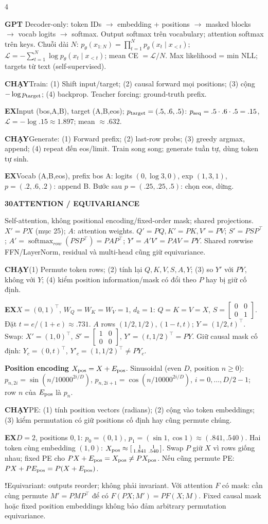 \documentclass[a4paper]{article}
\newcommand{\topic}[2]{\par\addvspace{.8pt}%
  \begingroup\setlength{\fboxsep}{0.5pt}%
  \noindent\colorbox{structure}{\parbox{\dimexpr\linewidth-2\fboxsep\relax}{%
    \color{white}\fontsize{6.5}{7.1}\selectfont\bfseries #1\enspace #2}}%
  \endgroup\par\nobreak\vspace{.3pt}\nobreak}
\newcommand{\run}[1]{\key{CHẠY}#1}
\newcommand{\key}[1]{\par\textcolor{structure}{\textbf{#1}}\enspace}
\newcommand{\note}[4]{\par\begingroup\setlength{\fboxsep}{0.15pt}%
  \noindent\colorbox{#1}{\parbox{\dimexpr\linewidth-2\fboxsep\relax}{%
    \RaggedRight\textcolor{#2}{\textbf{#3}}\enspace #4}}%
  \endgroup\par}
\newcommand{\trap}[1]{\note{warningbg}{warning}{!}{#1}}
\newcommand{\ex}[1]{\note{examplebg}{example}{EX}{#1}}
\begin{document}
\begin{multicols*}{4}
\key{GPT} Decoder-only: token IDs $\to$ embedding + positions $\to$ masked blocks $\to$ vocab logits $\to$ softmax. Output softmax trên vocabulary; attention softmax trên keys.
Chuỗi dài $N$: $p_\theta(x_{1:N})=\prod_{t=1}^N p_\theta(x_t\mid x_{<t})$;
$\mathcal L=-\sum_{t=1}^N\log p_\theta(x_t\mid x_{<t})$; mean CE $=\mathcal L/N$. Max likelihood = min NLL; targets từ text (self-supervised).
\run{Train: (1) Shift input/target; (2) causal forward mọi positions; (3) cộng $-\log p_{\rm target}$; (4) backprop. Teacher forcing: ground-truth prefix.}
\ex{Input (bos,A,B), target (A,B,eos); $p_{\rm target}=(.5,.6,.5)$: $p_{\rm seq}=.5\cdot.6\cdot.5=.15$, $\mathcal L=-\log .15\approx1.897$; mean $\approx.632$.}
\run{Generate: (1) Forward prefix; (2) last-row probs; (3) greedy argmax, append; (4) repeat đến eos/limit. Train song song; generate tuần tự, dùng token tự sinh.}
\ex{Vocab (A,B,eos), prefix bos A: logits $(0,\log3,0)$, exp $(1,3,1)$, $p=(.2,.6,.2)$: append B. Bước sau $p=(.25,.25,.5)$: chọn eos, dừng.}

\topic{30}{ATTENTION / EQUIVARIANCE}
Self-attention, không positional encoding/fixed-order mask; shared projections. $X'=PX$ (mục 25); $A$: attention weights.
$Q'=PQ,K'=PK,V'=PV$;
$S'=PSP^\top$;
$A'=\operatorname{softmax}_{row}(PSP^\top)=PAP^\top$;
$Y'=A'V'=PAV=PY$.
Shared rowwise FFN/LayerNorm, residual và multi-head cũng giữ equivariance.
\run{(1) Permute token rows; (2) tính lại $Q,K,V,S,A,Y$; (3) so $Y'$ với $PY$, không với $Y$; (4) kiểm position information/mask có đổi theo $P$ hay bị giữ cố định.}
\ex{$X=(0,1)^\top$, $W_Q=W_K=W_V=1$, $d_k=1$: $Q=K=V=X$, $S=\left[\begin{smallmatrix}0&0\\0&1\end{smallmatrix}\right]$. Đặt $t=e/(1+e)\approx.731$. $A$ rows $(1/2,1/2),(1-t,t)$; $Y=(1/2,t)^\top$. Swap: $X'=(1,0)^\top$, $S'=\left[\begin{smallmatrix}1&0\\0&0\end{smallmatrix}\right]$, $Y'=(t,1/2)^\top=PY$. Giữ causal mask cố định: $Y_c=(0,t)^\top$, $Y'_c=(1,1/2)^\top\ne PY_c$.}
\key{Position encoding}
$X_{\rm pos}=X+E_{\rm pos}$. Sinusoidal (even $D$, position $n\ge0$):
$p_{n,2i}=\sin(n/10000^{2i/D})$,
$p_{n,2i+1}=\cos(n/10000^{2i/D})$, $i=0,\ldots,D/2-1$; row $n$ của $E_{\rm pos}$ là $p_n$.
\run{PE: (1) tính position vectors (radians); (2) cộng vào token embeddings; (3) kiểm permutation có giữ positions cố định hay cũng permute chúng.}
\ex{$D=2$, positions $0,1$: $p_0=(0,1)$, $p_1=(\sin1,\cos1)\approx(.841,.540)$. Hai token cùng embedding $(1,0)$: $X_{\rm pos}\approx\left[\begin{smallmatrix}1&1\\1.841&.540\end{smallmatrix}\right]$. Swap $P$ giữ $X$ vì rows giống nhau; fixed PE cho $PX+E_{\rm pos}=X_{\rm pos}\ne PX_{\rm pos}$. Nếu cũng permute PE: $PX+PE_{\rm pos}=P(X+E_{\rm pos})$.}
\trap{Equivariant: outputs reorder; không phải invariant. Với attention $F$ có mask: cần cùng permute $M'=PMP^\top$ để có $F(PX;M')=PF(X;M)$. Fixed causal mask hoặc fixed position embeddings không bảo đảm arbitrary permutation equivariance.}
\end{multicols*}
\end{document}
